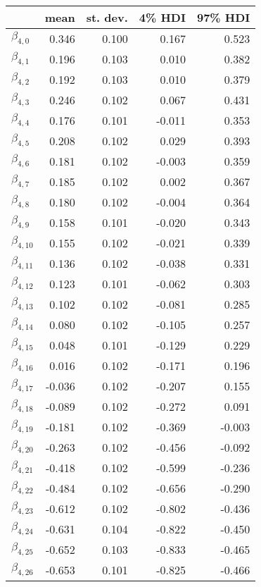 \begin{tabular}{lrrrr}
\toprule
{} &   mean &  st. dev. &  4\% HDI &  97\% HDI \\
\midrule
$\beta_{4,0}$  &  0.346 &     0.100 &    0.167 &     0.523 \\
$\beta_{4,1}$  &  0.196 &     0.103 &    0.010 &     0.382 \\
$\beta_{4,2}$  &  0.192 &     0.103 &    0.010 &     0.379 \\
$\beta_{4,3}$  &  0.246 &     0.102 &    0.067 &     0.431 \\
$\beta_{4,4}$  &  0.176 &     0.101 &   -0.011 &     0.353 \\
$\beta_{4,5}$  &  0.208 &     0.102 &    0.029 &     0.393 \\
$\beta_{4,6}$  &  0.181 &     0.102 &   -0.003 &     0.359 \\
$\beta_{4,7}$  &  0.185 &     0.102 &    0.002 &     0.367 \\
$\beta_{4,8}$  &  0.180 &     0.102 &   -0.004 &     0.364 \\
$\beta_{4,9}$  &  0.158 &     0.101 &   -0.020 &     0.343 \\
$\beta_{4,10}$ &  0.155 &     0.102 &   -0.021 &     0.339 \\
$\beta_{4,11}$ &  0.136 &     0.102 &   -0.038 &     0.331 \\
$\beta_{4,12}$ &  0.123 &     0.101 &   -0.062 &     0.303 \\
$\beta_{4,13}$ &  0.102 &     0.102 &   -0.081 &     0.285 \\
$\beta_{4,14}$ &  0.080 &     0.102 &   -0.105 &     0.257 \\
$\beta_{4,15}$ &  0.048 &     0.101 &   -0.129 &     0.229 \\
$\beta_{4,16}$ &  0.016 &     0.102 &   -0.171 &     0.196 \\
$\beta_{4,17}$ & -0.036 &     0.102 &   -0.207 &     0.155 \\
$\beta_{4,18}$ & -0.089 &     0.102 &   -0.272 &     0.091 \\
$\beta_{4,19}$ & -0.181 &     0.102 &   -0.369 &    -0.003 \\
$\beta_{4,20}$ & -0.263 &     0.102 &   -0.456 &    -0.092 \\
$\beta_{4,21}$ & -0.418 &     0.102 &   -0.599 &    -0.236 \\
$\beta_{4,22}$ & -0.484 &     0.102 &   -0.656 &    -0.290 \\
$\beta_{4,23}$ & -0.612 &     0.102 &   -0.802 &    -0.436 \\
$\beta_{4,24}$ & -0.631 &     0.104 &   -0.822 &    -0.450 \\
$\beta_{4,25}$ & -0.652 &     0.103 &   -0.833 &    -0.465 \\
$\beta_{4,26}$ & -0.653 &     0.101 &   -0.825 &    -0.466 \\
\bottomrule
\end{tabular}
